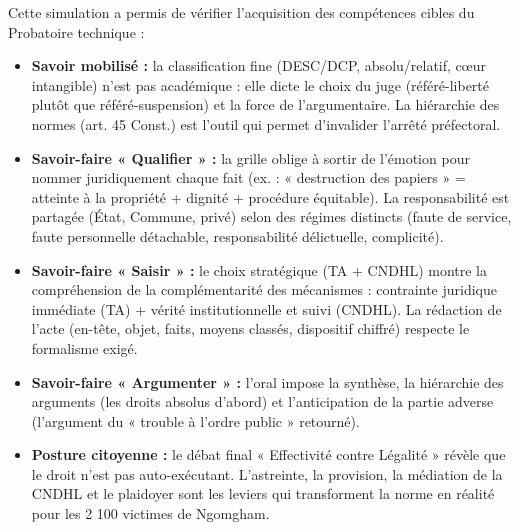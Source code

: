 \documentclass[11pt]{article}
\newcommand{\cle}[1]{{\popxbold\color{popdark}#1}}
\newcounter{popsec}
\newcounter{popsub}
\newcommand{\courssub}[1]{%
  \stepcounter{popsub}%
  \par\vspace{9pt}\noindent{\popxbold\fontsize{11.5}{13}\selectfont\color{popink}{\color{poporange}\thepopsec.\thepopsub}\hspace{6pt}#1}\par\nopagebreak\vspace{4pt}
}
\begin{document}
\courssub{Bilan de l'activité}
\noindent Cette simulation a permis de vérifier l'acquisition des compétences cibles du Probatoire technique :
\begin{itemize}
    \item \textbf{Savoir mobilisé :} la classification fine (DESC/DCP, absolu/relatif, cœur intangible) n'est pas académique : elle dicte le choix du juge (référé-liberté plutôt que référé-suspension) et la force de l'argumentaire. La hiérarchie des normes (art. 45 Const.) est l'outil qui permet d'invalider l'arrêté préfectoral.
    \item \textbf{Savoir-faire « Qualifier » :} la grille oblige à sortir de l'émotion pour nommer juridiquement chaque fait (ex. : « destruction des papiers » = atteinte à la propriété + dignité + procédure équitable). La responsabilité est partagée (État, Commune, privé) selon des régimes distincts (faute de service, faute personnelle détachable, responsabilité délictuelle, complicité).
    \item \textbf{Savoir-faire « Saisir » :} le choix stratégique (TA + CNDHL) montre la compréhension de la \cle{complémentarité des mécanismes} : contrainte juridique immédiate (TA) + vérité institutionnelle et suivi (CNDHL). La rédaction de l'acte (en-tête, objet, faits, moyens classés, dispositif chiffré) respecte le formalisme exigé.
    \item \textbf{Savoir-faire « Argumenter » :} l'oral impose la synthèse, la hiérarchie des arguments (les droits absolus d'abord) et l'anticipation de la partie adverse (l'argument du « trouble à l'ordre public » retourné).
    \item \textbf{Posture citoyenne :} le débat final « Effectivité contre Légalité » révèle que le droit n'est pas auto-exécutant. L'astreinte, la provision, la médiation de la CNDHL et le plaidoyer sont les leviers qui transforment la norme en réalité pour les 2 100 victimes de Ngomgham.
\end{itemize}
\end{document}
